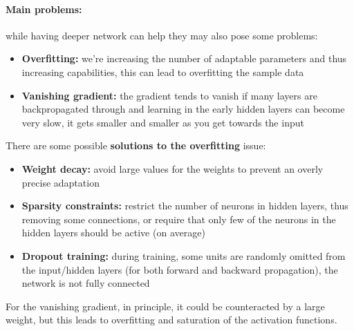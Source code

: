 \paragraph{Main problems:} while having deeper network can help they may also pose some problems:
\begin{itemize}
	\item \textbf{Overfitting:} we're increasing the number of adaptable parameters and thus increasing capabilities, this can lead to overfitting the sample data
	\item \textbf{Vanishing gradient:} the gradient tends to vanish if many layers are backpropagated through and learning in the early hidden layers can become very slow, it gets smaller and smaller as you get towards the input
\end{itemize}

There are some possible \textbf{solutions to the overfitting} issue: 
\begin{itemize}
	\item \textbf{Weight decay:} avoid large values for the weights to prevent an overly precise adaptation
	\item \textbf{Sparsity constraints:} restrict the number of neurons in hidden layers, thus removing some connections, or require that only few of the neurons in the hidden layers should be active (on average)
	\item \textbf{Dropout training:} during training, some units are randomly omitted from the input/hidden layers (for both forward and backward propagation), the network is not fully connected
\end{itemize}

For the vanishing gradient, in principle, it could be counteracted by a large weight, but this leads to overfitting and saturation of the activation functions.\\

\newpage

